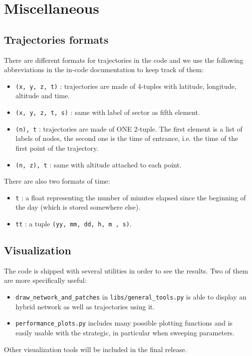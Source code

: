 \documentclass[12pt]{article}
\begin{document}
\section{Miscellaneous}

\subsection{Trajectories formats}

There are different formats for trajectories in the code and we use the following abbreviations in the in-code documentation to keep track of them:
\begin{itemize}
\item  \verb|(x, y, z, t)| : trajectories are made of 4-tuples with latitude, longitude, altitude and 
time.
\item \verb|(x, y, z, t, s)| : same with label of sector as fifth element.
\item \verb|(n), t| : trajectories are made of ONE 2-tuple. The first element is a list of labels
of nodes, the second one is the time of entrance, i.e. the time of the first point of the trajectory.
\item \verb|(n, z), t| : same with altitude attached to each point.
\end{itemize}
There are also two formats of time:
\begin{itemize}
\item \verb|t| : a float representing the number of minutes elapsed since the beginning of 
the day (which is stored somewhere else).
\item \verb|tt| : a tuple \verb|(yy, mm, dd, h, m , s)|.
\end{itemize}

\subsection{Visualization}

The code is shipped with several utilities in order to see the results. Two of them are more specifically useful:
\begin{itemize}
\item \verb|draw_network_and_patches| in \verb|libs/general_tools.py| is able to display an hybrid network as well as trajectories using it.
\item \verb|performance_plots.py| includes many possible plotting functions and is easily usable with the strategic, in particular when sweeping parameters. 
\end{itemize}
Other visualization tools will be included in the final release.
\end{document}
